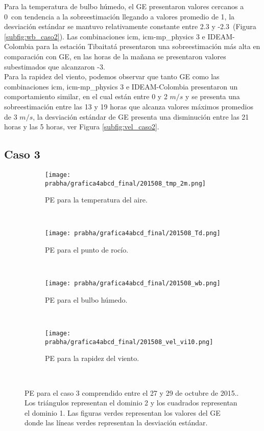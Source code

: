 Para la temperatura de bulbo húmedo, el GE presentaron valores cercanos a 0\celc\ con tendencia a la sobreestimación llegando a valores promedio de 1\celc, la desviación estándar se mantuvo relativamente constante entre 2.3 y -2.3\celsius\ (Figura \ref{subfig:wb_caso2}). Las combinaciones icm, icm-mp\_physics 3 e IDEAM-Colombia para la estación Tibaitatá presentaron una sobreestimación más alta en comparación con GE, en las horas de la mañana se presentaron valores subestimados que alcanzaron -3\celc.\\

Para la rapidez del viento, podemos observar que tanto GE como las combinaciones icm, icm-mp\_physics 3 e IDEAM-Colombia presentaron un comportamiento similar, en el cual están entre 0 y 2 $m/s$ y se presenta una sobreestimación entre las 13 y 19 horas que alcanza valores máximos promedios de 3 $m/s$, la desviación estándar de GE presenta una disminución entre las 21 horas y las 5 horas, ver Figura \ref{subfig:vel_caso2}.\\


\subsection{Caso 3}

\begin{figure}[H]
    \centering
    \begin{subfigure}[b]{0.45\textwidth}
        \caption{PE para la temperatura del aire.}
	\texttt{[image: prabha/grafica4abcd\_final/201508\_tmp\_2m.png]}
    \label{subfig:tmp_0_caso3}
	\end{subfigure}
	~
	    \begin{subfigure}[b]{0.45\textwidth}
	        \caption{PE para el punto de rocío.}
	\texttt{[image: prabha/grafica4abcd\_final/201508\_Td.png]}

    \label{subfig:td_caso3}
	\end{subfigure}
	~
	    \begin{subfigure}[b]{0.45\textwidth}
	\caption{PE para el bulbo húmedo.}
	\texttt{[image: prabha/grafica4abcd\_final/201508\_wb.png]}
    \label{subfig:wb_caso3}
	\end{subfigure}
	~
	    \begin{subfigure}[b]{0.45\textwidth}
	\caption{PE para la rapidez del viento.}	
	\texttt{[image: prabha/grafica4abcd\_final/201508\_vel\_vi10.png]}
    
    \label{subfig:vel_caso3}
	\end{subfigure}
	~

\caption{PE para el caso 3 comprendido entre el 27 y 29 de octubre de 2015.. Los triángulos representan el dominio 2 y los cuadrados representan el dominio 1. Las figuras verdes representan los valores del GE donde las líneas verdes representan la desviación estándar.}	
\label{subfig:mbe_caso3}	
\end{figure}

